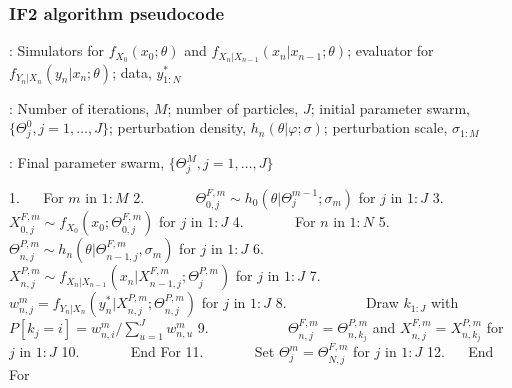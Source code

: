 \documentclass{beamer}\usepackage[]{graphicx}\usepackage[]{color}
\begin{document}
\begin{frame}[fragile]

\frametitle{IF2 algorithm pseudocode}

:
Simulators for $f_{X_0}(x_0;\theta)$ and $f_{X_n|X_{n-1}}(x_n| x_{n-1}; \theta)$;
evaluator for $f_{Y_n|X_n}(y_n| x_n;\theta)$;
data, $y^*_{1:N}$ 

:
Number of iterations, $M$;
number of particles, $J$;
initial parameter swarm, $\{\Theta^0_j, j=1,\dots,J\}$;
perturbation density, $h_n(\theta|\varphi;\sigma)$;
perturbation scale, $\sigma_{1{:}M}$ 

:
Final parameter swarm, $\{\Theta^M_j, j=1,\dots,J\}$ 


1. $\quad$ For $m$ in $1{:} M$
2. $\quad\quad\quad$ $\Theta^{F,m}_{0,j}\sim h_0(\theta|\Theta^{m-1}_{j}; \sigma_m)$ for $j$ in $1{:} J$
3. $\quad\quad\quad$ $X_{0,j}^{F,m}\sim f_{X_0}(x_0 ; \Theta^{F,m}_{0,j})$ for $j$ in $1{:} J$
4. $\quad\quad\quad$ For $n$ in $1{:} N$
5. $\quad\quad\quad\quad\quad$ $\Theta^{P,m}_{n,j}\sim h_n(\theta|\Theta^{F,m}_{n-1,j},\sigma_m)$ for $j$ in $1{:} J$
6. $\quad\quad\quad\quad\quad$ $X_{n,j}^{P,m}\sim f_{X_n|X_{n-1}}(x_n | X^{F,m}_{n-1,j}; \Theta^{P,m}_j)$ for $j$ in $1{:} J$
7. $\quad\quad\quad\quad\quad$ $w_{n,j}^m = f_{Y_n|X_n}(y^*_n| X_{n,j}^{P,m} ; \Theta^{P,m}_{n,j})$ for $j$ in $1{:} J$
8. $\quad\quad\quad\quad\quad$ Draw $k_{1{:}J}$ with $P[k_j=i]=  w_{n,i}^m\Big/\sum_{u=1}^J w_{n,u}^m$
9.  $\quad\quad\quad\quad\quad$ $\Theta^{F,m}_{n,j}=\Theta^{P,m}_{n,k_j}$ and $X^{F,m}_{n,j}=X^{P,m}_{n,k_j}$ for $j$ in $1{:} J$
10. $\quad\quad\quad$ End For
11. $\quad\quad\quad$ Set $\Theta^{m}_{j}=\Theta^{F,m}_{N,j}$ for $j$ in $1{:} J$
12. $\quad$ End For

\end{frame}
\end{document}
